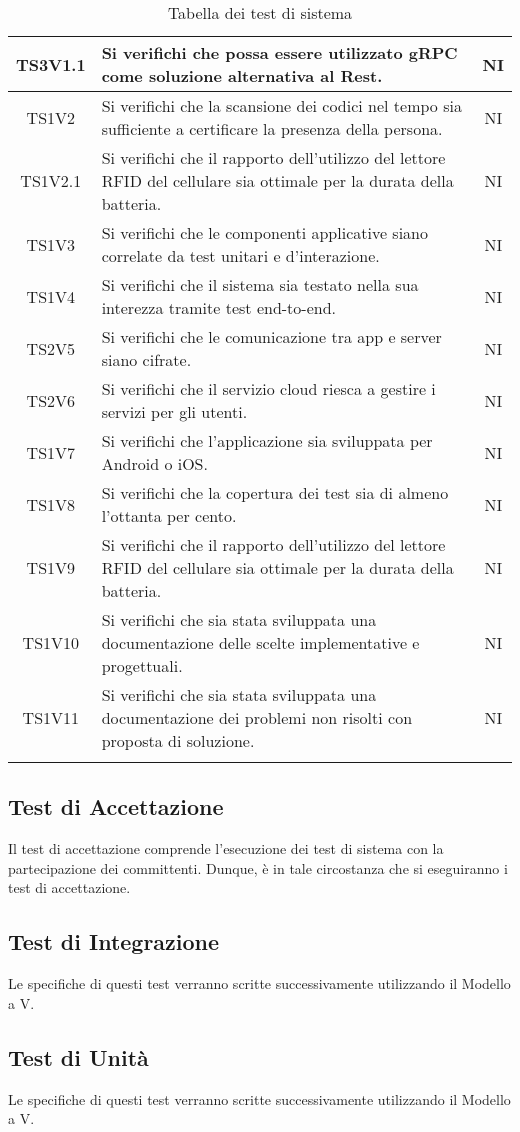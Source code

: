 \begin{center}
\begin{longtable}{|c|p{10cm}|c|}
			\hline
			TS3V1.1 & Si verifichi che possa essere utilizzato gRPC come soluzione alternativa al Rest. & NI \\	
			\hline
			TS1V2 & Si verifichi che la scansione dei codici nel tempo sia sufficiente a certificare la presenza della persona. & NI \\	
			\hline
			TS1V2.1 & Si verifichi che il rapporto dell'utilizzo del lettore RFID del cellulare sia ottimale per la durata della batteria. & NI \\	
			\hline
			TS1V3 & Si verifichi che le componenti applicative siano correlate da test unitari e d'interazione. & NI \\	
			\hline
			TS1V4 & Si verifichi che il sistema sia testato nella sua interezza tramite test end-to-end. & NI \\	
			\hline
			TS2V5 & Si verifichi che le comunicazione tra app e server siano cifrate. & NI \\	
			\hline
			TS2V6 & Si verifichi che il servizio cloud riesca a gestire i servizi per gli utenti. & NI \\	
			\hline
			TS1V7 & Si verifichi che l'applicazione sia sviluppata per Android o iOS. & NI \\	
			\hline
			TS1V8 & Si verifichi che la copertura dei test  sia di almeno l'ottanta per cento. & NI \\	
			\hline
			TS1V9 & Si verifichi che il rapporto dell'utilizzo del lettore RFID del cellulare sia ottimale per la durata della batteria. & NI \\	
			\hline
			TS1V10 & Si verifichi che sia stata sviluppata una documentazione delle scelte implementative e progettuali. & NI \\	
			\hline
			TS1V11 & Si verifichi che sia stata sviluppata una documentazione dei problemi non risolti con proposta di soluzione. & NI \\	
			\hline
			\hiderowcolors
			\caption{Tabella dei test di sistema}		
		\end{longtable}	
	\end{center}

	\subsection{Test di Accettazione}
	Il test di accettazione comprende l'esecuzione dei test di sistema con la partecipazione dei committenti. Dunque, è in tale circostanza che si eseguiranno i test di accettazione. 
	\subsection{Test di Integrazione}
	Le specifiche di questi test verranno scritte successivamente utilizzando il Modello a V.
	\subsection{Test di Unità}
	Le specifiche di questi test verranno scritte successivamente utilizzando il Modello a V.
